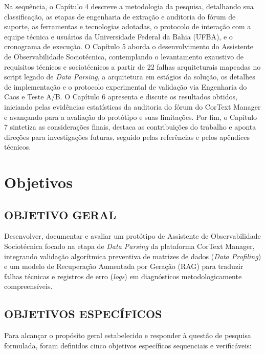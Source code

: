 \documentclass[
	oneside,
	a4paper,
	12pt,
	chapter=TITLE,
	section=TITLE,
	english,
	brazilian
]{abntex2}
\begin{document}
Na sequência, o Capítulo 4 descreve a metodologia da pesquisa, detalhando sua classificação, as etapas de engenharia de extração e auditoria do fórum de suporte, as ferramentas e tecnologias adotadas, o protocolo de interação com a equipe técnica e usuários da Universidade Federal da Bahia (UFBA), e o cronograma de execução. O Capítulo 5 aborda o desenvolvimento do Assistente de Observabilidade Sociotécnica, contemplando o levantamento exaustivo de requisitos técnicos e sociotécnicos a partir de 22 falhas arquiteturais mapeadas no script legado de \textit{Data Parsing}, a arquitetura em estágios da solução, os detalhes de implementação e o protocolo experimental de validação via Engenharia do Caos e Teste A/B. O Capítulo 6 apresenta e discute os resultados obtidos, iniciando pelas evidências estatísticas da auditoria do fórum do CorText Manager e avançando para a avaliação do protótipo e suas limitações. Por fim, o Capítulo 7 sintetiza as considerações finais, destaca as contribuições do trabalho e aponta direções para investigações futuras, seguido pelas referências e pelos apêndices técnicos.

\chapter{Objetivos}\label{sec:objetivos}


\FloatBarrier
\section{OBJETIVO GERAL}\label{sec:objetivo_geral}


Desenvolver, documentar e avaliar um protótipo de Assistente de Observabilidade Sociotécnica focado na etapa de \textit{Data Parsing} da plataforma CorText Manager, integrando validação algorítmica preventiva de matrizes de dados (\textit{Data Profiling}) e um modelo de Recuperação Aumentada por Geração (RAG) para traduzir falhas técnicas e registros de erro (\textit{logs}) em diagnósticos metodologicamente compreensíveis.

\FloatBarrier
\section{OBJETIVOS ESPECÍFICOS}\label{sec:objetivos_especificos}


Para alcançar o propósito geral estabelecido e responder à questão de pesquisa formulada, foram definidos cinco objetivos específicos sequenciais e verificáveis:
\end{document}

